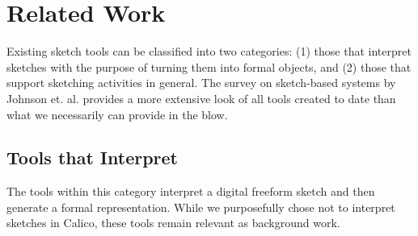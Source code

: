 \chapter{Related Work}
\label{chapter:related-work}

Existing sketch tools can be classified into two categories: (1) those that interpret sketches with the purpose of turning them into formal objects, and (2) those that support sketching activities in general. The survey on sketch-based systems by Johnson et. al. \citep{Johnson} provides a more extensive look of all tools created to date than what we necessarily can provide in the blow.

\section{Tools that Interpret}
\label{relatedwork:1}

The  tools within this category interpret a digital freeform sketch and then generate a formal representation. While we purposefully chose not to interpret sketches in Calico, these tools remain relevant as background work.

